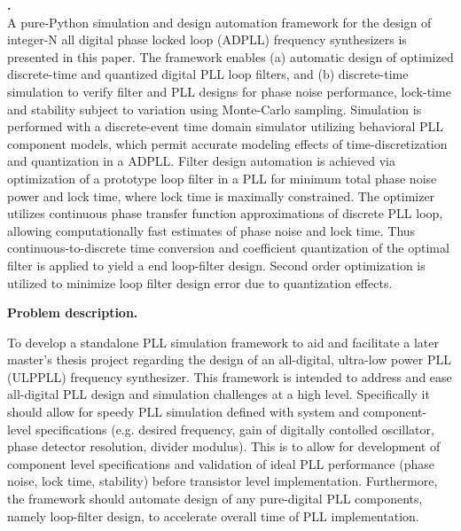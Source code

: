 \documentclass[10pt,a4paper]{article}
\renewenvironment{abstract}
 {\par\noindent\Huge\textbf{\abstractname.}\\\vspace{1em}\ignorespaces}
 {\par\medskip}
\begin{document}
	\setcounter{page}{1}
	\pagebreak
	\thispagestyle{nohdr}
	\begin{abstract}
		\large\fontfamily{\rmdefault}\selectfont 
		A pure-Python simulation and design automation framework for the design of integer-N all digital phase locked loop (ADPLL) frequency synthesizers is presented in this paper. The framework enables (a) automatic design of optimized discrete-time and quantized digital PLL loop filters, and (b) discrete-time simulation to verify filter and PLL designs for phase noise performance, lock-time and stability subject to variation using Monte-Carlo sampling. Simulation is performed with a discrete-event time domain simulator utilizing behavioral PLL component models, which permit accurate modeling effects of time-discretization and quantization in a ADPLL. Filter design automation is achieved via optimization of a prototype loop filter in a PLL for minimum total phase noise power and lock time, where lock time is maximally constrained. The optimizer utilizes continuous phase transfer function approximations of discrete PLL loop, allowing computationally fast estimates of phase noise and lock time. Thus continuous-to-discrete time conversion and coefficient quantization of the optimal filter is applied to yield a end loop-filter design. Second order optimization is utilized to minimize loop filter design error due to quantization effects.
	\end{abstract}

	\pagebreak
	\thispagestyle{nohdr}
	\null\pagebreak
	\thispagestyle{nohdr}
	\Huge\textbf{Problem description.}\\
	\vspace{1em}
	\large\fontfamily{\rmdefault}\selectfont 
	
	To develop a standalone PLL simulation framework to aid and facilitate a later master's thesis project regarding the design of an all-digital, ultra-low power PLL (ULPPLL) frequency synthesizer. This framework is intended to address and ease all-digital PLL design and simulation challenges at a high level. Specifically it should allow for speedy PLL simulation defined with system and component- level specifications (e.g. desired frequency, gain of digitally contolled oscillator, phase detector resolution, divider modulus). This is to allow for development of component level specifications and validation of ideal PLL performance (phase noise, lock time, stability) before transistor level implementation. Furthermore, the framework should automate design of any pure-digital PLL components, namely loop-filter design, to accelerate overall time of PLL implementation.
\end{document}
